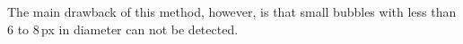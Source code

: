 The main drawback of this method, however, is that small bubbles with less than 6 to 8\,px in diameter can not be detected. 



















